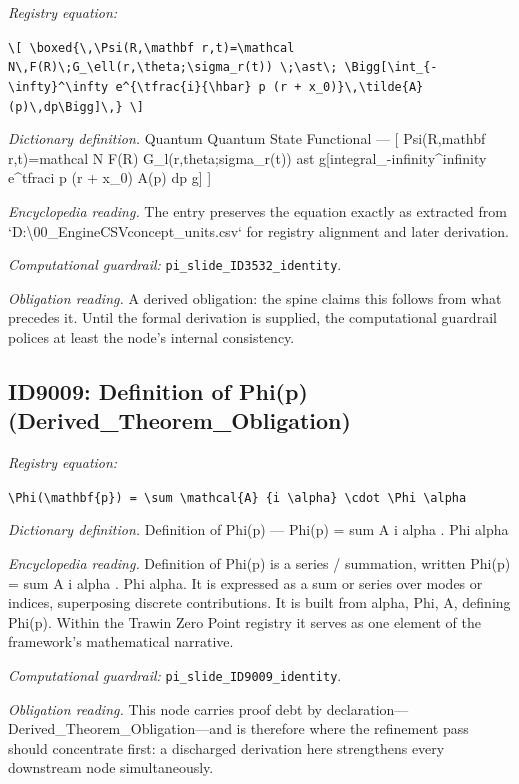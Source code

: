 \documentclass[11pt]{article}
\theoremstyle{remark}
\begin{document}
\noindent\textit{Registry equation:}\par
{\small\texttt{\textbackslash{}[ \textbackslash{}boxed\{\textbackslash{},\textbackslash{}Psi(R,\textbackslash{}mathbf r,t)=\textbackslash{}mathcal N\textbackslash{},F(R)\textbackslash{};G\_\textbackslash{}ell(r,\textbackslash{}theta;\textbackslash{}sigma\_r(t)) \textbackslash{};\textbackslash{}ast\textbackslash{}; \textbackslash{}Bigg[\textbackslash{}int\_\{-\textbackslash{}infty\}\textasciicircum{}\textbackslash{}infty e\textasciicircum{}\{\textbackslash{}tfrac\{i\}\{\textbackslash{}hbar\} p (r + x\_0)\}\textbackslash{},\textbackslash{}tilde\{A\}(p)\textbackslash{},dp\textbackslash{}Bigg]\textbackslash{},\} \textbackslash{}]}}\par\medskip
\noindent\textit{Dictionary definition.} Quantum Quantum State Functional --- [ Psi(R,mathbf r,t)=mathcal N F(R) G\_l(r,theta;sigma\_r(t)) ast g[integral\_-infinity\textasciicircum{}infinity e\textasciicircum{}tfraci p (r + x\_0) A(p) dp g] ]\par\medskip
\noindent\textit{Encyclopedia reading.} The entry preserves the equation exactly as extracted from `D:\textbackslash{}00\_EngineCSVconcept\_units.csv` for registry alignment and later derivation.
\par\medskip\noindent\textit{Computational guardrail:} \texttt{pi\_slide\_ID3532\_identity}.
\par\medskip\noindent\textit{Obligation reading.} A derived obligation: the spine claims this follows from what precedes it. Until the formal derivation is supplied, the computational guardrail polices at least the node's internal consistency.

\subsection{ID9009: Definition of Phi(p) (Derived\_Theorem\_Obligation)}

\noindent\textit{Registry equation:}\par
{\small\texttt{\textbackslash{}Phi(\textbackslash{}mathbf\{p\}) = \textbackslash{}sum \textbackslash{}mathcal\{A\} \{i \textbackslash{}alpha\} \textbackslash{}cdot \textbackslash{}Phi \textbackslash{}alpha}}\par\medskip
\noindent\textit{Dictionary definition.} Definition of Phi(p) --- Phi(p) = sum A i alpha . Phi alpha\par\medskip
\noindent\textit{Encyclopedia reading.} Definition of Phi(p) is a series / summation, written Phi(p) = sum A i alpha . Phi alpha. It is expressed as a sum or series over modes or indices, superposing discrete contributions. It is built from alpha, Phi, A, defining Phi(p). Within the Trawin Zero Point registry it serves as one element of the framework's mathematical narrative.
\par\medskip\noindent\textit{Computational guardrail:} \texttt{pi\_slide\_ID9009\_identity}.
\par\medskip\noindent\textit{Obligation reading.} This node carries proof debt by declaration---Derived\_Theorem\_Obligation---and is therefore where the refinement pass should concentrate first: a discharged derivation here strengthens every downstream node simultaneously.
\end{document}
